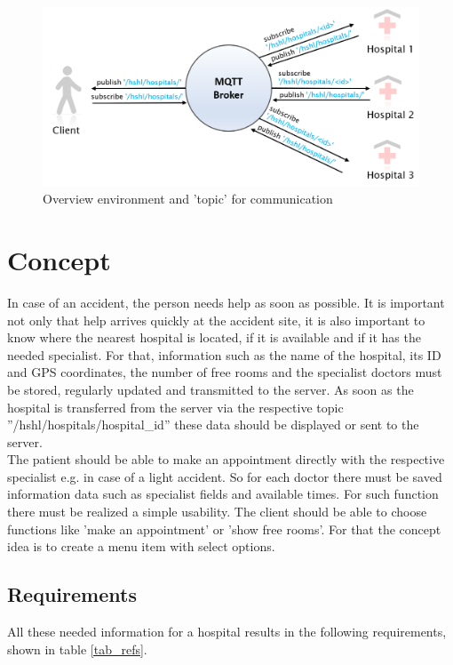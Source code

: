 \begin{figure}
\centering
\sidecaption
\includegraphics[scale=.375]{images/melanie_images/Bild1-5.png}
\caption{Overview environment and 'topic' for communication}
\label{Overview environment}
\end{figure}



\section{Concept}
\label{sec:3}
In case of an accident, the person needs help as soon as possible. 
It is important not only that help arrives quickly at the accident site, 
it is also important to know where the nearest hospital is located, 
if it is available and if it has the needed specialist. For that, information such as the name of the hospital, its ID and  GPS coordinates, the number of free rooms and the specialist doctors must be stored, regularly updated and transmitted to the server.
As soon as the hospital is transferred from the server via the respective topic ''/hshl/hospitals/hospital_id'' 
these data should be displayed or sent to the server. 
\\
The patient should be able to make an appointment directly with the respective specialist e.g. in case of a light accident.
So for each doctor there must be saved information data such as specialist fields and available times.
For such function there must be realized a simple usability. The client should be able to choose functions like 'make an appointment' or 'show free rooms'. For that the concept idea is to create a menu item with select options.


\subsection{Requirements}
All these needed information for a hospital results in the following requirements, shown in table \ref{tab_refs}.

